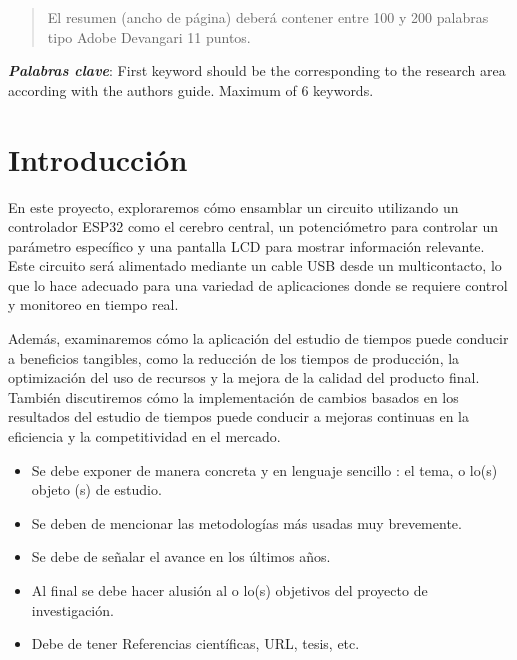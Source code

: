     
    
    \begin{abstract}
    \noindent 
    El resumen (ancho de página) deberá contener entre 100 y 200 palabras tipo Adobe Devangari 11 puntos.
    
    \end{abstract}
    \textbf{\textit{Palabras clave}}: {First keyword should be the corresponding to the research area according with the authors guide. Maximum of 6 keywords.}
    
    \section{Introducción}
    
    En este proyecto, exploraremos cómo ensamblar un circuito utilizando un controlador ESP32 como el cerebro central, un potenciómetro para controlar un parámetro específico y una pantalla LCD para mostrar información relevante. Este circuito será alimentado mediante un cable USB desde un multicontacto, lo que lo hace adecuado para una variedad de aplicaciones donde se requiere control y monitoreo en tiempo real.
    
    Además, examinaremos cómo la aplicación del estudio de tiempos puede conducir a beneficios tangibles, como la reducción de los tiempos de producción, la optimización del uso de recursos y la mejora de la calidad del producto final. También discutiremos cómo la implementación de cambios basados en los resultados del estudio de tiempos puede conducir a mejoras continuas en la eficiencia y la competitividad en el mercado.
    \begin{itemize}
        \item Se debe exponer de manera concreta y en lenguaje sencillo : el tema, o lo(s) objeto (s) de estudio. 
        \item Se deben de mencionar las metodologías más usadas muy brevemente. 
        \item Se debe de señalar el avance en los últimos años.
        \item Al final se debe hacer alusión al o lo(s) objetivos del proyecto de investigación.
        \item Debe de tener Referencias científicas, URL, tesis, etc.
    \end{itemize}
